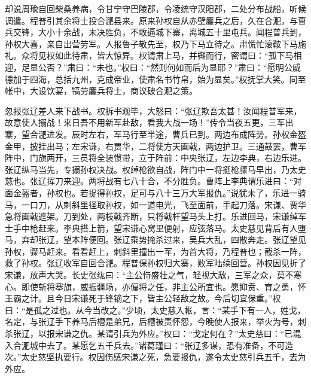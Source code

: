 却说周瑜自回柴桑养病，令甘宁守巴陵郡，令凌统守汉阳郡，二处分布战船，听候调遣。程普引其余将士投合淝县来。原来孙权自从赤壁鏖兵之后，久在合淝，与曹兵交锋，大小十余战，未决胜负，不敢逼城下寨，离城五十里屯兵。闻程普兵到，孙权大喜，亲自出营劳军。人报鲁子敬先至，权乃下马立待之。肃慌忙滚鞍下马施礼。众将见权如此待肃，皆大惊异。权请肃上马，并辔而行，密谓曰：“孤下马相迎，足显公否？”肃曰：“未也。”权曰：“然则何如而后为显耶？”肃曰：“愿明公威德加于四海，总括九州，克成帝业，使肃名书竹帛，始为显矣。”权抚掌大笑。同至帐中，大设饮宴，犒劳鏖兵将士，商议破合淝之策。

忽报张辽差人来下战书。权拆书观毕，大怒曰：“张辽欺吾太甚！汝闻程普军来，故意使人搦战！来日吾不用新军赴敌，看我大战一场！”传令当夜五更，三军出寨，望合淝进发。辰时左右，军马行至半途，曹兵已到。两边布成阵势。孙权金盔金甲，披挂出马；左宋谦，右贾华，二将使方天画戟，两边护卫。三通鼓罢，曹军阵中，门旗两开，三员将全装惯带，立于阵前：中央张辽，左边李典，右边乐进。张辽纵马当先，专搦孙权决战。权绰枪欲自战，阵门中一将挺枪骤马早出，乃太史慈也。张辽挥刀来迎。两将战有七八十合，不分胜负。曹阵上李典谓乐进曰：“对面金盔者，孙权也。若捉得孙权，足可与八十三万大军报仇。”说犹未了，乐进一骑马，一口刀，从刺斜里径取孙权，如一道电光，飞至面前，手起刀落。宋谦、贾华急将画戟遮架。刀到处，两枝戟齐断，只将戟杆望马头上打。乐进回马，宋谦绰军士手中枪赶来。李典搭上箭，望宋谦心窝里便射，应弦落马。太史慈见背后有人堕马，弃却张辽，望本阵便回。张辽乘势掩杀过来，吴兵大乱，四散奔走。张辽望见孙权，骤马赶来。看看赶上，刺斜里撞出一军，为首大将，乃程普也；截杀一阵，救了孙权。张辽收军自回合淝。程普保孙权归大寨，败军陆续回营。孙权因见折了宋谦，放声大哭。长史张纮曰：“主公恃盛壮之气，轻视大敌，三军之众，莫不寒心。即使斩将搴旗，威振疆场，亦偏将之任，非主公所宜也。愿抑贲、育之勇，怀王霸之计。且今日宋谦死于锋镝之下，皆主公轻敌之故。今后切宜保重。”权曰：“是孤之过也。从今当改之。”少顷，太史慈入帐，言：“某手下有一人，姓戈，名定，与张辽手下养马后槽是弟兄，后槽被责怀怨，今晚使人报来，举火为号，刺杀张辽，以报宋谦之仇。某请引兵为外应。”权曰：“戈定何在？”太史慈曰：“已混入合淝城中去了。某愿乞五千兵去。”诸葛瑾曰：“张辽多谋，恐有准备，不可造次。”太史慈坚执要行。权因伤感宋谦之死，急要报仇，遂令太史慈引兵五千，去为外应。

